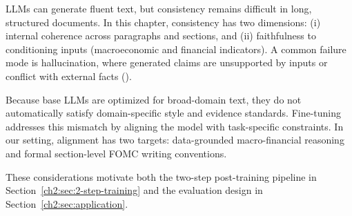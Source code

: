 %
%
LLMs can generate fluent text, but consistency remains difficult in long, structured documents. In this chapter, consistency has two dimensions: (i) internal coherence across paragraphs and sections, and (ii) faithfulness to conditioning inputs (macroeconomic and financial indicators). A common failure mode is hallucination, where generated claims are unsupported by inputs or conflict with external facts (\cite{huang2025survey}).

Because base LLMs are optimized for broad-domain text, they do not automatically satisfy domain-specific style and evidence standards. Fine-tuning addresses this mismatch by aligning the model with task-specific constraints. In our setting, alignment has two targets: data-grounded macro-financial reasoning and formal section-level FOMC writing conventions.

These considerations motivate both the two-step post-training pipeline in Section~\ref{ch2:sec:2-step-training} and the evaluation design in Section~\ref{ch2:sec:application}.

